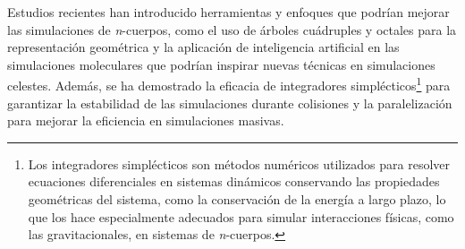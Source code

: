 Estudios recientes han introducido herramientas y enfoques que podrían mejorar las simulaciones de \textit{n}-cuerpos, como el uso de árboles cuádruples y octales para la representación geométrica y la aplicación de inteligencia artificial en las simulaciones moleculares que podrían inspirar nuevas técnicas en simulaciones celestes. Además, se ha demostrado la eficacia de integradores simplécticos\footnote{Los integradores simplécticos son métodos numéricos utilizados para resolver ecuaciones diferenciales en sistemas dinámicos conservando las propiedades geométricas del sistema, como la conservación de la energía a largo plazo, lo que los hace especialmente adecuados para simular interacciones físicas, como las gravitacionales, en sistemas de \textit{n}-cuerpos.} para garantizar la estabilidad de las simulaciones durante colisiones y la paralelización para mejorar la eficiencia en simulaciones masivas.
